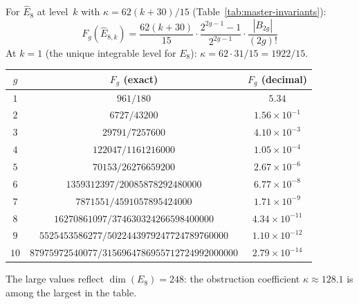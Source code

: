 \begin{computation}\label{comp:e8-genus-expansion}

For $\widehat{E}_8$ at level~$k$ with $\kappa = 62(k+30)/15$ (Table~\ref{tab:master-invariants}):
\begin{equation}\label{eq:e8-Fg}
F_g(\widehat{E}_{8,k}) = \frac{62(k+30)}{15} \cdot \frac{2^{2g-1}-1}{2^{2g-1}} \cdot \frac{|B_{2g}|}{(2g)!}
\end{equation}
At $k = 1$ (the unique integrable level for $E_8$): $\kappa = 62 \cdot 31/15 = 1922/15$.
\begin{center}
\renewcommand{\arraystretch}{1.3}
\begin{tabular}{ccc}
\toprule
$g$ & $F_g$ (exact) & $F_g$ (decimal) \\
\midrule
$1$ & $961/180$ & $5.34$ \\
$2$ & $6727/43200$ & $1.56 \times 10^{-1}$ \\
$3$ & $29791/7257600$ & $4.10 \times 10^{-3}$ \\
$4$ & $122047/1161216000$ & $1.05 \times 10^{-4}$ \\
$5$ & $70153/26276659200$ & $2.67 \times 10^{-6}$ \\
$6$ & $1359312397/20085878292480000$ & $6.77 \times 10^{-8}$ \\
$7$ & $7871551/4591057895424000$ & $1.71 \times 10^{-9}$ \\
$8$ & $16270861097/374630324266598400000$ & $4.34 \times 10^{-11}$ \\
$9$ & $5525453586277/5022443979247724789760000$ & $1.10 \times 10^{-12}$ \\
$10$ & $87975972540077/3156964786955712724992000000$ & $2.79 \times 10^{-14}$ \\
\bottomrule
\end{tabular}
\end{center}
The large values reflect $\dim(E_8) = 248$: the obstruction coefficient $\kappa \approx 128.1$ is among the largest in the table.
\end{computation}

